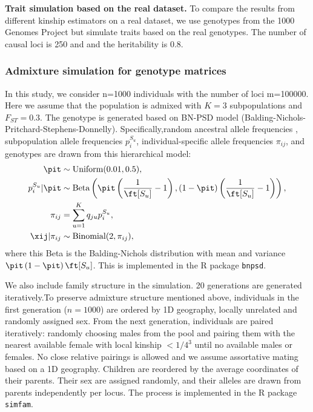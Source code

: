 \documentclass[11pt]{article}
\begin{document}
\textbf{Trait simulation based on the real dataset.}
To compare the results from different kinship estimators on a real dataset, we use genotypes from the 1000 Genomes Project \citep{the_1000_genomes_project_consortium_map_2010, 1000_genomes_project_consortium_integrated_2012} but simulate traits based on the real genotypes. The number of causal loci is 250 and and the heritability is 0.8.

\subsubsection{Admixture simulation for genotype matrices}

In this study, we consider n=1000 individuals with the number of loci m=100000. Here we assume that the population is admixed with $K=3$ subpopulations and $F_{ST}=0.3$. The genotype is generated based on BN-PSD model (Balding-Nichols-Pritchard-Stephens-Donnelly). Specifically,random ancestral allele frequencies \pit, subpopulation allele frequencies $p_i^{S_u}$, individual-specific allele frequencies $\pi_{ij}$, and genotypes \xij are drawn from this hierarchical model:
\begin{align*}
  \pit
  &\sim
    \text{Uniform}( 0.01, 0.5 )
    , \\
  p_i^{S_u} | \pit
  &\sim
    \text{Beta} \left(
    \pit \left( \frac{1}{ \ft[S_u] } - 1 \right),
    \left( 1 - \pit \right) \left( \frac{1}{ \ft[S_u] } - 1 \right)
    \right)
    , \\
  \pi_{ij}
  &=
    \sum_{u = 1}^K q_{ju} p_i^{S_u}
    , \\
  \xij | \pi_{ij}
  &\sim
    \text{Binomial}(2, \pi_{ij})
    ,
\end{align*}
where this Beta is the Balding-Nichols distribution \citep{balding_method_1995} with mean \pit and variance $\pit \left( 1 - \pit \right) \ft[S_u]$.
This is implemented in the R package \texttt{bnpsd}.

We also include family structure in the simulation. 20 generations are generated iteratively.To preserve admixture structure mentioned above, individuals in the first generation ($n=1000$) are ordered by 1D geography, locally unrelated and randomly assigned sex. 
From the next generation, individuals are paired iteratively: randomly choosing males from the pool and pairing them with the nearest available female with local kinship $<1/4^3$ until no available males or females. No close relative pairings is allowed and we assume assortative mating based on a 1D geography. Children are reordered by the average coordinates of their parents. Their sex are assigned randomly, and their alleles are drawn from parents independently per locus. The process is implemented in the R package \texttt{simfam}.
\end{document}
